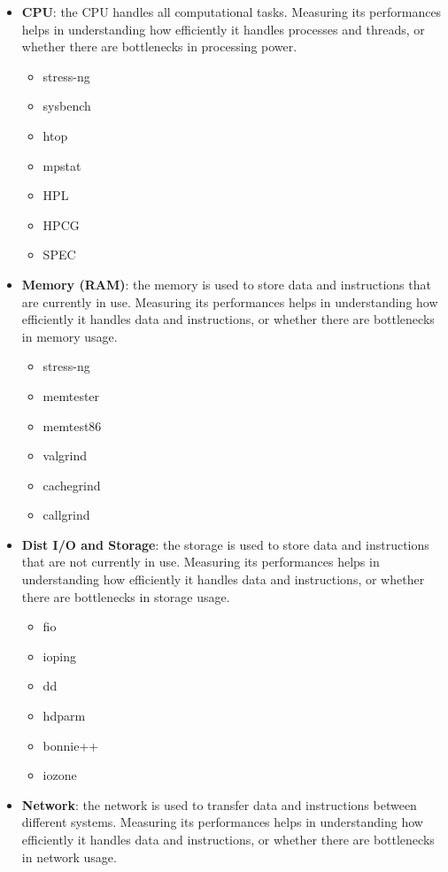 \begin{itemize}
    \item \textbf{CPU}: the CPU handles all computational tasks. Measuring its performances helps in understanding how efficiently it handles processes and threads, or whether there are bottlenecks in processing power. 
        \begin{itemize}
            \item stress-ng
            \item sysbench
            \item htop 
            \item mpstat 
            \item HPL 
            \item HPCG 
            \item SPEC
        \end{itemize}
    \item \textbf{Memory (RAM)}: the memory is used to store data and instructions that are currently in use. Measuring its performances helps in understanding how efficiently it handles data and instructions, or whether there are bottlenecks in memory usage.
        \begin{itemize}
            \item stress-ng
            \item memtester
            \item memtest86
            \item valgrind
            \item cachegrind
            \item callgrind
        \end{itemize}
    \item \textbf{Dist I/O and Storage}: the storage is used to store data and instructions that are not currently in use. Measuring its performances helps in understanding how efficiently it handles data and instructions, or whether there are bottlenecks in storage usage.
        \begin{itemize}
            \item fio
            \item ioping
            \item dd
            \item hdparm
            \item bonnie++
            \item iozone
        \end{itemize}
    \item \textbf{Network}: the network is used to transfer data and instructions between different systems. Measuring its performances helps in understanding how efficiently it handles data and instructions, or whether there are bottlenecks in network usage.

\end{itemize}
